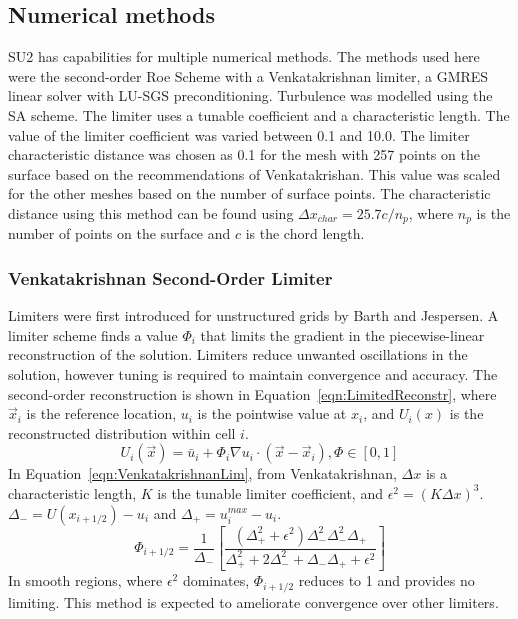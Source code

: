 
\subsection*{Numerical methods}
SU2 has capabilities for multiple numerical methods. The methods used here were the second-order Roe Scheme with a Venkatakrishnan limiter, a GMRES linear solver with LU-SGS preconditioning. Turbulence was modelled using the SA scheme. The limiter uses a tunable coefficient and a characteristic length. The value of the limiter coefficient was varied between 0.1 and 10.0. The limiter characteristic distance was chosen as 0.1 for the mesh with 257 points on the surface based on the recommendations of Venkatakrishan\cite{Venkatakrishnan:1993}. This value was scaled for the other meshes based on the number of surface points. The characteristic distance using this method can be found using $\Delta x_{char} = 25.7 c  / n_p $, where $n_p$ is the number of points on the surface and $c$ is the chord length. 

\subsubsection*{Venkatakrishnan Second-Order Limiter}
Limiters were first introduced for unstructured grids by Barth and Jespersen\cite{barth1989}. A limiter scheme finds a value $\Phi_i$ that limits the gradient in the piecewise-linear reconstruction of the solution. Limiters reduce unwanted oscillations in the solution, however tuning is required to maintain convergence and accuracy. The second-order reconstruction is shown in Equation~\ref{eqn:LimitedReconstr}, where $\vec{x}_i$ is the reference location, $u_i$ is the pointwise value at $x_i$, and $U_i(x)$ is the reconstructed distribution within cell $i$.
\begin{equation}\label{eqn:LimitedReconstr}
U_i(\vec{x}) = \bar{u}_i + \Phi_i \nabla u_i \cdot (\vec{x}-\vec{x}_i ), \Phi\in [0,1]
\end{equation}
In Equation~\ref{eqn:VenkatakrishnanLim}, from Venkatakrishnan\cite{Venkatakrishnan:1993}, $\Delta x$ is a characteristic length, $K$ is the tunable limiter coefficient, and $\epsilon^2 = (K\Delta x)^3$. $\Delta_-=U(x_{i+1/2})-u_i$ and $\Delta_+ = u_i^{max}-u_i$. 
\begin{equation}\label{eqn:VenkatakrishnanLim}
\Phi_{i+1/2} = \frac{1}{\Delta_-}\left[ \frac{(\Delta_+^2+\epsilon^2)\Delta_-^2\Delta_-^2\Delta_+}{\Delta_+^2+2\Delta_-^2+\Delta_-\Delta_++\epsilon^2}\right]
\end{equation}
In smooth regions, where $\epsilon^2$ dominates,  $\Phi_{i+1/2}$ reduces to 1 and provides no limiting. This method is expected to ameliorate convergence over other limiters. 
